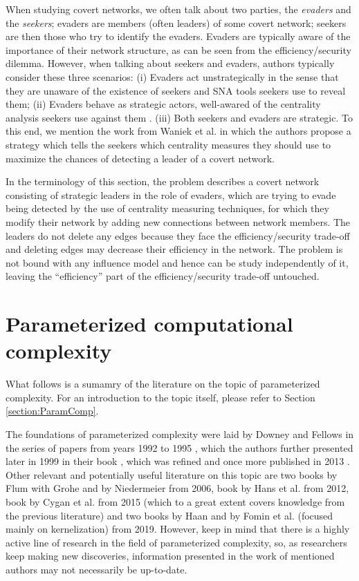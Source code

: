 When studying covert networks, we often talk about two parties, the \emph{evaders} and the \emph{seekers};
evaders are members (often leaders) of some covert network;
seekers are then those who try to identify the evaders.
Evaders are typically aware of the importance of their network structure, as can be seen from
the efficiency/security dilemma.
However, when talking about seekers and evaders, authors typically consider these three scenarios:
(i) Evaders act unstrategically in the sense that they are unaware of
the existence of seekers and SNA tools seekers use to reveal them;
(ii) Evaders behave as strategic actors, well-awared of the centrality analysis
seekers use against them \cite{Waniek2017,Dey2019,Waniek2016,Dey2020}.
(iii) Both seekers and evaders are strategic.
To this end, we mention the work from Waniek et al. \cite{Waniek2021} in which the authors propose a strategy
which tells the seekers which centrality measures they should use
to maximize the chances of detecting a leader of a covert network.

In the terminology of this section, the \HL problem describes a covert network consisting of strategic leaders
in the role of evaders, which are trying to evade being detected by the use of centrality measuring techniques,
for which they modify their network by adding new connections between network members.
The leaders do not delete any edges because they face the efficiency/security trade-off and
deleting edges may decrease their efficiency in the network.
The problem is not bound with any influence model and hence can be study independently of it,
leaving the ``efficiency'' part of the efficiency/security trade-off untouched.


\section{Parameterized computational complexity}

What follows is a sumamry of the literature on the topic of parameterized complexity.
For an introduction to the topic itself, please refer to Section \ref{section:ParamComp}.

The foundations of parameterized complexity were laid by Downey and Fellows
in the series of papers from years 1992 to 1995 \cite{Downey1995.1,Downey1995.2,Downey1993,Downey1995.4},
which the authors further presented later in 1999 in their book \cite{Downey1999},
which was refined and once more published in 2013 \cite{Downey2013}.
Other relevant and potentially useful literature on this topic are
two books by Flum with Grohe \cite{Flum2006} and by Niedermeier \cite{Niedermeier2006} from 2006, book by Hans et al. \cite{Hans2012} from 2012,
book by Cygan et al. \cite{Cygan2015} from 2015 (which to a great extent covers knowledge from the previous literature)
and two books by Haan \cite{Haan2019} and by Fomin et al. (focused mainly on kernelization) \cite{Fomin2019} from 2019.
However, keep in mind that there is a highly active line of research in the field of parameterized complexity, so,
as researchers keep making new discoveries, information presented in the work of mentioned authors may not necessarily be up-to-date.
